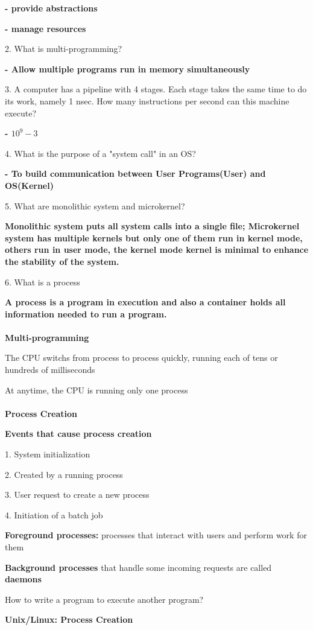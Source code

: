 \documentclass[]{report}
\begin{document}
\textbf{- provide abstractions}

\textbf{- manage resources}

2. What is multi-programming?

\textbf{- Allow multiple programs run in memory simultaneously}

3. A computer has a pipeline with 4 stages. Each stage takes the same time to do its work, namely 1 nsec. How many instructions per second can this machine execute?

\textbf{- $10^9 - 3$}

4. What is the purpose of a "system call" in an OS?

\textbf{- To build communication between User Programs(User) and OS(Kernel)}

5. What are monolithic system and microkernel?

\textbf{Monolithic system puts all system calls into a single file; Microkernel system has multiple kernels but only one of them run in kernel mode, others run in user mode, the kernel mode kernel is minimal to enhance the stability of the system.}

6. What is a process

\textbf{A process is a program in execution and also a container holds all information needed to run a program.}\\\\
\textbf{Multi-programming}

The CPU switchs from process to process quickly, running each of tens or hundreds of milliseconds

At anytime, the CPU is running only one process\\\\
\textbf{Process Creation}

\textbf{Events that cause process creation}

1. System initialization

2. Created by a running process

3. User request to create a new process

4. Initiation of a batch job

\textbf{Foreground processes: }processes that interact with users and perform work for them

\textbf{Background processes} that handle some incoming requests are called \textbf{daemons}

How to write a program to execute another program?

\textbf{Unix/Linux: Process Creation}
\end{document}
